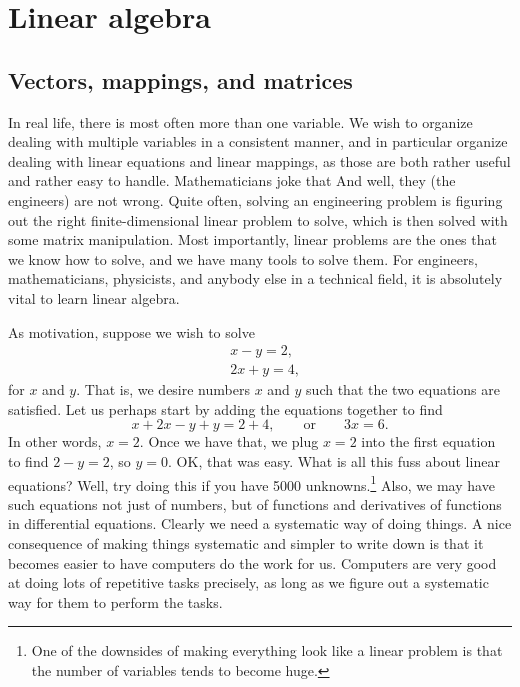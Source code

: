 \chapter{Linear algebra} \label{linalg:appendix}


\section{Vectors, mappings, and matrices}
\label{vecsandmaps:section}



In real life, there is most often more than one variable.
We wish to organize dealing with multiple variables in a consistent
manner, and in particular organize dealing with linear equations and linear
mappings, as those are both rather useful and rather easy to handle.
Mathematicians joke that
And well, they (the engineers) are not wrong.
Quite often, solving an engineering problem is figuring out the
right finite-dimensional linear problem to solve, which is then
solved with some matrix manipulation.
Most importantly, linear problems are the ones that we know how to solve,
and we have many tools to solve them.
For engineers, mathematicians, physicists, and anybody else in a technical
field, it is absolutely vital to learn linear algebra.

As motivation, suppose we wish to solve
\begin{equation*}
\begin{aligned}
& x-y = 2 , \\
& 2x+y = 4 ,
\end{aligned}
\end{equation*}
for $x$ and $y$.
That is, we desire numbers $x$ and $y$ such that the two
equations are satisfied.
Let us perhaps start by adding the equations together to find
\begin{equation*}
x+2x-y+y = 2+4, \qquad \text{or} \qquad 3x = 6 .
\end{equation*}
In other words, $x=2$.  Once we have that, we plug $x=2$ into the
first equation to find $2-y=2$, so $y=0$.  OK\@, that was easy.  What is all
this fuss about linear equations?  Well, try doing this if you have
5000 unknowns.\footnote{One of the downsides of making everything look like a
linear problem is that the number of variables tends to become huge.}
Also, we may have such equations not just of numbers,
but of functions and derivatives of functions in differential equations.
Clearly we need a systematic way of doing things.
A nice consequence of making things systematic and simpler to write down
is that it becomes easier to have computers do the work for us.
Computers are very good at doing lots of repetitive
tasks precisely, as long as we figure out a systematic way for them to
perform the tasks.

